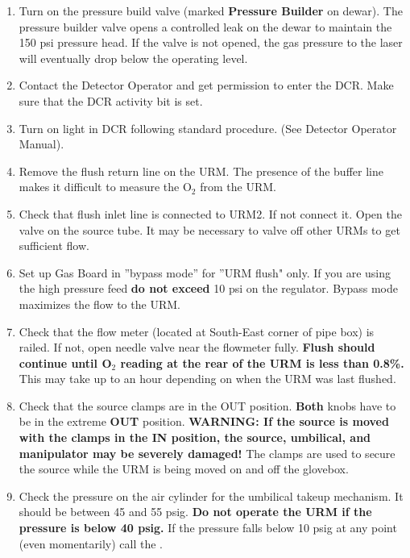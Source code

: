 \documentclass[11pt]{article}
\begin{document}
\begin{enumerate}
\item \CheckBox[name=rluo3]{} Turn on the pressure build valve (marked {\bf Pressure Builder} on dewar). The pressure builder valve opens a controlled leak on the dewar to maintain the 150 psi pressure head. If the valve is not opened, the gas pressure to the laser will eventually drop below the operating level.
\item \CheckBox[name=rluo4]{} Contact the Detector Operator and get permission to enter the DCR. Make sure that the DCR activity bit is set.
\item \CheckBox[name=rluo5]{} Turn on light in DCR following standard procedure. (See Detector Operator Manual).
\item {} Remove the flush return line on the URM. The presence of the buffer line makes it difficult to measure the O$_{2}$ from the URM.
\item {} Check that flush inlet line is connected to URM2. If not connect it. Open the valve on the source tube. It may be necessary to valve off other URMs to get sufficient flow.
\item {} Set up Gas Board in ''bypass mode'' for ''URM flush" only. If you are using the high pressure feed {\bf do not exceed} 10 psi on the regulator. Bypass mode maximizes the flow to the URM.
\item {} Check that the flow meter (located at South-East corner of pipe box) is railed. If not, open needle valve near the flowmeter fully. {\bf Flush should continue until O$_{2}$ reading at the rear of the URM is less than 0.8\%.} This may take up to an hour depending on when the URM was last flushed.
\item \CheckBox[name=rluo10]{} Check that the source clamps are in the OUT position. {\bf Both} knobs have to be in the extreme {\bf OUT} position. {\bf WARNING: If the source is moved with the clamps in the IN position, the source, umbilical, and manipulator may be severely damaged!} The clamps are used to secure the source while the URM is being moved on and off the glovebox.
\item \CheckBox[name=rluo11]{} Check the pressure on the air cylinder for the umbilical takeup mechanism. It should be between 45 and 55 psig. {\bf Do not operate the URM if the pressure is below 40 psig.} If the pressure falls below 10 psig at any point (even momentarily) call the .

\end{enumerate}
\end{document}
